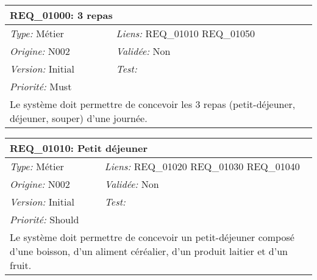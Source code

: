 
\begin{table}[!h]

\begin{tabular}{|p{60mm}p{100mm}|}

\hline

\multicolumn{2}{|l|}{\textbf{REQ\_01000:} 3 repas} \\ \hline

\emph{Type:} Métier & \emph{Liens:} REQ\_01010 REQ\_01050  \\

\emph{Origine:} N002 & \emph{Validée:} Non \\

\emph{Version:} Initial & \emph{Test:}  \\

\emph{Priorité:} Must & \\ \hline

\multicolumn{2}{|p{16cm}|}{Le système doit permettre de concevoir les 3 repas (petit-déjeuner, déjeuner, souper) d'une journée.} \\ \hline

\end{tabular}

\end{table}



\begin{table}[!h]

\begin{tabular}{|p{60mm}p{100mm}|}

\hline

\multicolumn{2}{|l|}{\textbf{REQ\_01010:} Petit déjeuner} \\ \hline

\emph{Type:} Métier & \emph{Liens:} REQ\_01020 REQ\_01030 REQ\_01040  \\

\emph{Origine:} N002 & \emph{Validée:} Non \\

\emph{Version:} Initial & \emph{Test:}  \\

\emph{Priorité:} Should & \\ \hline

\multicolumn{2}{|p{16cm}|}{Le système doit permettre de concevoir un petit-déjeuner composé d'une boisson, d'un aliment céréalier, d'un produit laitier et d'un fruit.} \\ \hline

\end{tabular}

\end{table}



